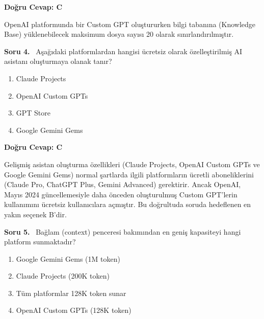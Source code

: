 \documentclass[11pt,a4paper,openany]{book}
\begin{document}
\vspace{4pt}
\begin{tcolorbox}[title=Cevap ve Açıklama, colback=gray!3!white, colframe=primarycolor!90!black, arc=2mm, fonttitle=\bfseries\sffamily, top=6pt, bottom=6pt]
    \textbf{Doğru Cevap: C}

    \vspace{2pt}
    OpenAI platformunda bir Custom GPT oluştururken bilgi tabanına (Knowledge Base) yüklenebilecek maksimum dosya sayısı 20 olarak sınırlandırılmıştır.
\end{tcolorbox}
\vspace{10pt}
\needspace{5cm}
\vspace{8pt}
\noindent\textbf{\large\sffamily Soru 4.} \ Aşağıdaki platformlardan hangisi ücretsiz olarak özelleştirilmiş AI asistanı oluşturmaya olanak tanır?

\begin{enumerate}[label=\Alph*), leftmargin=25pt, topsep=4pt, itemsep=2pt]
        \item Claude Projects
        \item OpenAI Custom GPTs
        \item GPT Store
        \item Google Gemini Gems
\end{enumerate}

\vspace{4pt}
\begin{tcolorbox}[title=Cevap ve Açıklama, colback=gray!3!white, colframe=primarycolor!90!black, arc=2mm, fonttitle=\bfseries\sffamily, top=6pt, bottom=6pt]
    \textbf{Doğru Cevap: C}

    \vspace{2pt}
    Gelişmiş asistan oluşturma özellikleri (Claude Projects, OpenAI Custom GPTs ve Google Gemini Gems) normal şartlarda ilgili platformların ücretli aboneliklerini (Claude Pro, ChatGPT Plus, Gemini Advanced) gerektirir. Ancak OpenAI, Mayıs 2024 güncellemesiyle daha önceden oluşturulmuş Custom GPT'lerin kullanımını ücretsiz kullanıcılara açmıştır. Bu doğrultuda soruda hedeflenen en yakın seçenek B'dir.
\end{tcolorbox}
\vspace{10pt}
\needspace{5cm}
\vspace{8pt}
\noindent\textbf{\large\sffamily Soru 5.} \ Bağlam (context) penceresi bakımından en geniş kapasiteyi hangi platform sunmaktadır?

\begin{enumerate}[label=\Alph*), leftmargin=25pt, topsep=4pt, itemsep=2pt]
        \item Google Gemini Gems (1M token)
        \item Claude Projects (200K token)
        \item Tüm platformlar 128K token sunar
        \item OpenAI Custom GPTs (128K token)
\end{enumerate}
\end{document}
